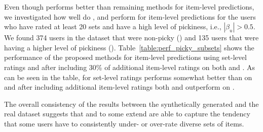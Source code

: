 Even though
\ARM performs better than remaining methods for item-level predictions, we investigated how
well do \ARM, \ES and \VO perform for item-level predictions for the users who have rated at least 20 sets and
have a high level of pickiness, i.e., $|\beta_u| > 0.5$. We found 374 users in the
dataset that were non-picky (\unonpicky) and 135 users that were having a higher level of
pickiness (\upicky). 
Table~\ref{table:perf_picky_subsets} shows the performance of the proposed
methods for item-level predictions using set-level ratings and after
including 30\% of additional item-level ratings on both \upicky and
\unonpicky. As can be seen in the table, for set-level ratings
\VO performs somewhat better than \ARM on \upicky and
after including additional item-level ratings  both \ES and \VO
outperform \ARM on \upicky.

The overall consistency of the results between the synthetically generated and
the real dataset suggests that \VO and to some extend \ES 
are able to capture the tendency that some users have to consistently under- or
over-rate  diverse sets of items.


